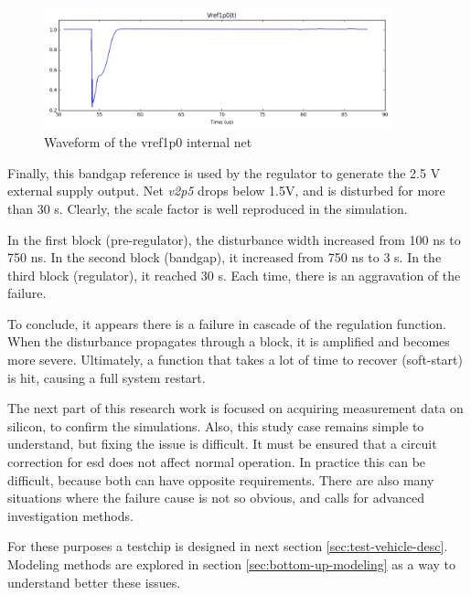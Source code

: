 \begin{figure}[!htbp]
  \centering
  \includegraphics[width=0.9\textwidth]{src/3/figures/v1p0.png}
  \caption{Waveform of the vref1p0 internal net}
  \label{fig:wvf-v1p0}
\end{figure}

Finally, this bandgap reference is used by the regulator to generate the 2.5 V external supply output.
Net \textit{v2p5} drops below 1.5V, and is disturbed for more than 30 \textmugreek{}s.
Clearly, the scale factor is well reproduced in the simulation.

In the first block (pre-regulator), the disturbance width increased from 100 ns to 750 ns.
In the second block (bandgap), it increased from 750 ns to 3 \textmugreek{}s.
In the third block (regulator), it reached 30 \textmugreek{}s.
Each time, there is an aggravation of the failure.


To conclude, it appears there is a failure in cascade of the regulation function.
When the disturbance propagates through a block, it is amplified and becomes more severe.
Ultimately, a function that takes a lot of time to recover (soft-start) is hit, causing a full system restart.

The next part of this research work is focused on acquiring measurement data on silicon, to confirm the simulations.
Also, this study case remains simple to understand, but fixing the issue is difficult.
It must be ensured that a circuit correction for \gls{esd} does not affect normal operation.
In practice this can be difficult, because both can have opposite requirements.
There are also many situations where the failure cause is not so obvious, and calls for advanced investigation methods.

For these purposes a testchip is designed in next section \ref{sec:test-vehicle-desc}.
Modeling methods are explored in section \ref{sec:bottom-up-modeling} as a way to understand better these issues.
